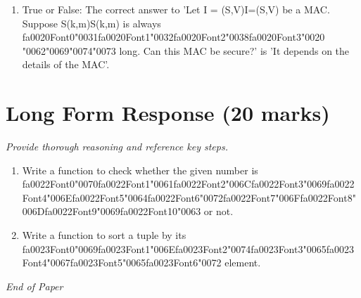 \documentclass[12pt]{article}
\begin{document}
\begin{enumerate}[label=\arabic*.]
\item True or False: The correct answer to 'Let I = (S,V)I=(S,V) be a MAC. Suppose S(k,m)S(k,m) is always {\csname fa0020Font0\endcsname\char"0031}{\csname fa0020Font1\endcsname\char"0032}{\csname fa0020Font2\endcsname\char"0038}{\csname fa0020Font3\endcsname\char"0020} {\char"0062}{\char"0069}{\char"0074}{\char"0073} long. Can this MAC be secure?' is 'It depends on the details of the MAC'.
\end{enumerate}

\section*{Long Form Response (20 marks)}
\textit{Provide thorough reasoning and reference key steps.}
\begin{enumerate}[label=\arabic*.]
\item Write a function to check whether the given number is {\csname fa0022Font0\endcsname\char"0070}{\csname fa0022Font1\endcsname\char"0061}{\csname fa0022Font2\endcsname\char"006C}{\csname fa0022Font3\endcsname\char"0069}{\csname fa0022Font4\endcsname\char"006E}{\csname fa0022Font5\endcsname\char"0064}{\csname fa0022Font6\endcsname\char"0072}{\csname fa0022Font7\endcsname\char"006F}{\csname fa0022Font8\endcsname\char"006D}{\csname fa0022Font9\endcsname\char"0069}{\csname fa0022Font10\endcsname\char"0063} or not.
\item Write a function to sort a tuple by its {\csname fa0023Font0\endcsname\char"0069}{\csname fa0023Font1\endcsname\char"006E}{\csname fa0023Font2\endcsname\char"0074}{\csname fa0023Font3\endcsname\char"0065}{\csname fa0023Font4\endcsname\char"0067}{\csname fa0023Font5\endcsname\char"0065}{\csname fa0023Font6\endcsname\char"0072} element.
\end{enumerate}

\vfill
\noindent\textit{End of Paper}
\end{document}
